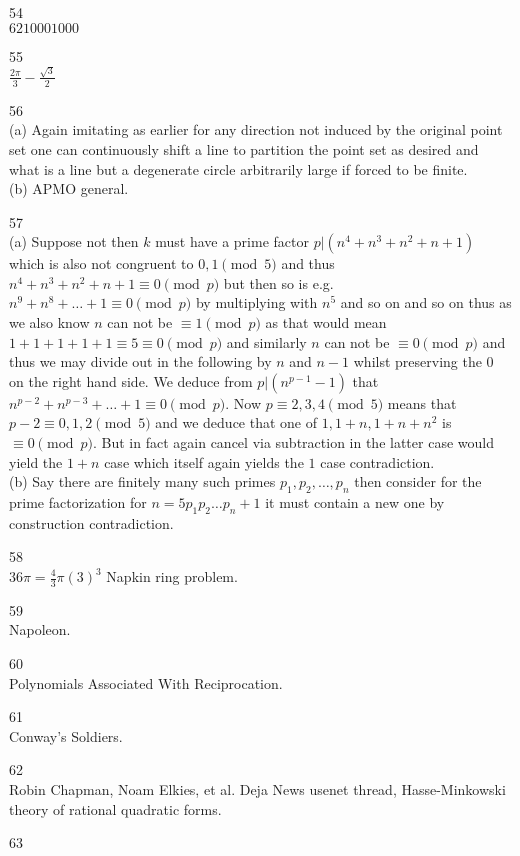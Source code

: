 54 \\
$\boxed{6210001000}$

55 \\
$\boxed{\frac{2\pi}{3}-\frac{\sqrt{3}}{2}}$

56 \\
(a) Again imitating as earlier for any direction not induced by the original point set one can continuously shift a line to partition the point set as desired and what is a line but a degenerate circle arbitrarily large if forced to be finite. \\
(b) APMO general.

57 \\
(a) Suppose not then $k$ must have a prime factor $p|(n^4+n^3+n^2+n+1)$ which is also not congruent to $0,1 \pmod{5}$ and thus $n^4+n^3+n^2+n+1 \equiv 0 \pmod{p}$ but then so is e.g. $n^9+n^8+\dots +1 \equiv 0 \pmod{p}$ by multiplying with $n^5$ and so on and so on thus as we also know $n$ can not be $\equiv 1 \pmod{p}$ as that would mean $1+1+1+1+1 \equiv 5 \equiv 0 \pmod{p}$ and similarly $n$ can not be $\equiv 0 \pmod{p}$ and thus we may divide out in the following by $n$ and $n-1$ whilst preserving the $0$ on the right hand side. We deduce from $p|(n^{p-1}-1)$ that $n^{p-2}+n^{p-3}+\dots +1 \equiv 0 \pmod{p}$. Now $p \equiv 2,3,4 \pmod{5}$ means that $p-2 \equiv 0,1,2 \pmod{5}$ and we deduce that one of $1,1+n,1+n+n^2$ is $\equiv 0 \pmod{p}$. But in fact again cancel via subtraction in the latter case would yield the $1+n$ case which itself again yields the $1$ case contradiction. \\
(b) Say there are finitely many such primes $p_1,p_2,\dots,p_n$ then consider for the prime factorization for $n=5p_1p_2\dots p_n+1$ it must contain a new one by construction contradiction.

58 \\
$\boxed{36\pi}=\frac{4}{3}\pi(3)^3$ Napkin ring problem.

59 \\
Napoleon.

60 \\
Polynomials Associated With Reciprocation.

61 \\
Conway's Soldiers.

62 \\
Robin Chapman, Noam Elkies, et al. Deja News usenet thread, Hasse-Minkowski theory of rational quadratic forms.

63 \\


